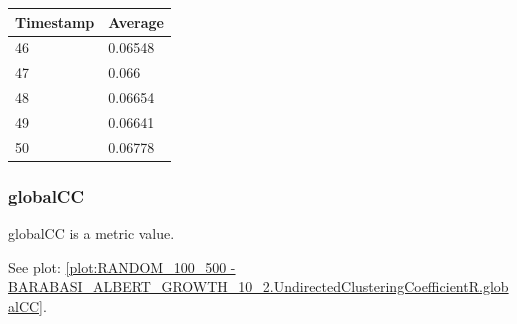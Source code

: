 \begin{tabular}{|l||l|}
\hline
	\textbf{Timestamp} & \textbf{Average} \\ \hline
	46 & 0.06548 \\ \hline
	47 & 0.066 \\ \hline
	48 & 0.06654 \\ \hline
	49 & 0.06641 \\ \hline
	50 & 0.06778 \\ \hline
\end{tabular}

\subsubsection{globalCC}
globalCC is a metric value.

See plot: \ref{plot:RANDOM_100_500 - BARABASI_ALBERT_GROWTH_10_2.UndirectedClusteringCoefficientR.globalCC}.

